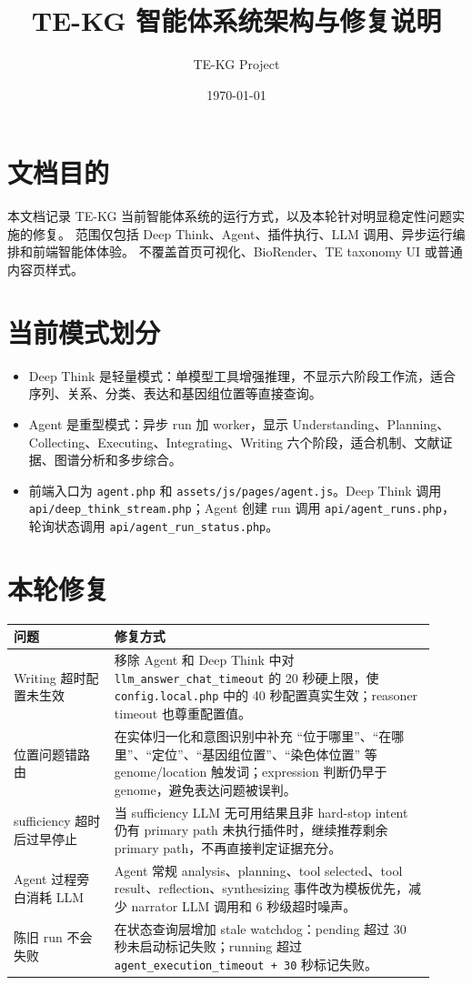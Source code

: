\documentclass[UTF8]{ctexart}
\title{TE-KG 智能体系统架构与修复说明}
\author{TE-KG Project}
\date{\today}
\begin{document}
\maketitle

\section{文档目的}

本文档记录 TE-KG 当前智能体系统的运行方式，以及本轮针对明显稳定性问题实施的修复。
范围仅包括 Deep Think、Agent、插件执行、LLM 调用、异步运行编排和前端智能体体验。
不覆盖首页可视化、BioRender、TE taxonomy UI 或普通内容页样式。

\section{当前模式划分}

\begin{itemize}
  \item Deep Think 是轻量模式：单模型工具增强推理，不显示六阶段工作流，适合序列、关系、分类、表达和基因组位置等直接查询。
  \item Agent 是重型模式：异步 run 加 worker，显示 Understanding、Planning、Collecting、Executing、Integrating、Writing 六个阶段，适合机制、文献证据、图谱分析和多步综合。
  \item 前端入口为 \texttt{agent.php} 和 \texttt{assets/js/pages/agent.js}。Deep Think 调用 \texttt{api/deep\_think\_stream.php}；Agent 创建 run 调用 \texttt{api/agent\_runs.php}，轮询状态调用 \texttt{api/agent\_run\_status.php}。
\end{itemize}

\section{本轮修复}

\begin{longtable}{p{0.22\linewidth}p{0.70\linewidth}}
\textbf{问题} & \textbf{修复方式} \\
\hline
Writing 超时配置未生效 & 移除 Agent 和 Deep Think 中对 \texttt{llm\_answer\_chat\_timeout} 的 20 秒硬上限，使 \texttt{config.local.php} 中的 40 秒配置真实生效；reasoner timeout 也尊重配置值。 \\
位置问题错路由 & 在实体归一化和意图识别中补充 ``位于哪里''、``在哪里''、``定位''、``基因组位置''、``染色体位置'' 等 genome/location 触发词；expression 判断仍早于 genome，避免表达问题被误判。 \\
sufficiency 超时后过早停止 & 当 sufficiency LLM 无可用结果且非 hard-stop intent 仍有 primary path 未执行插件时，继续推荐剩余 primary path，不再直接判定证据充分。 \\
Agent 过程旁白消耗 LLM & Agent 常规 analysis、planning、tool selected、tool result、reflection、synthesizing 事件改为模板优先，减少 narrator LLM 调用和 6 秒级超时噪声。 \\
陈旧 run 不会失败 & 在状态查询层增加 stale watchdog：pending 超过 30 秒未启动标记失败；running 超过 \texttt{agent\_execution\_timeout + 30} 秒标记失败。 \\
\end{longtable}
\end{document}
